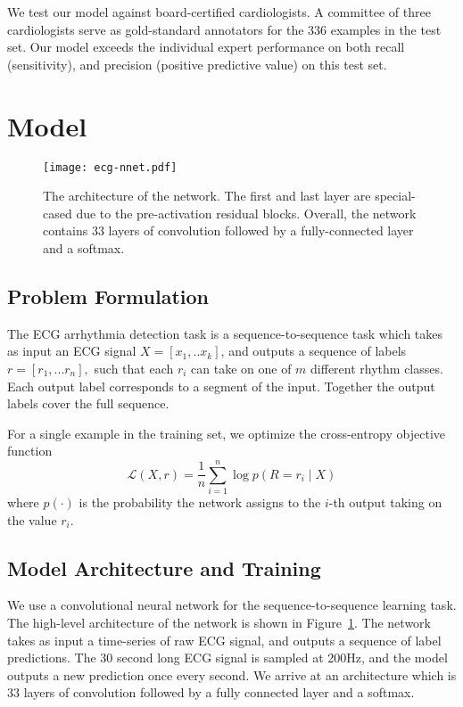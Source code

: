 \documentclass{article}
\begin{document}
We test our model against board-certified cardiologists. A committee of three cardiologists serve as gold-standard annotators for the 336 examples in the test set. Our model exceeds the individual expert performance on both recall (sensitivity), and precision (positive predictive value) on this test set.

\section{Model}
\label{model}
\begin{figure}[ht!]
  \centering
  \texttt{[image: ecg-nnet.pdf]}
  \caption{The architecture of the network. The first and last layer are special-cased due to the pre-activation residual blocks. Overall, the network contains 33 layers of convolution followed by a fully-connected layer and a softmax.}
  \label{fig:net}
\end{figure}


\subsection*{Problem Formulation}
The ECG arrhythmia detection task is a sequence-to-sequence task which takes as input an ECG signal $X=[x_1,.. x_k]$, and outputs a sequence of labels $r=[r_1, ... r_n],$ such that each $r_i$ can take on one of $m$ different rhythm classes. Each output label corresponds to a segment of the input. Together the output labels cover the full sequence.

For a single example in the training set, we optimize the cross-entropy objective function
\[
 \mathcal{L}(X, r) = \frac{1}{n} \sum_{i=1}^n \log p(R = r_i \mid X)
\]
where $p(\cdot)$ is the probability the network assigns to the $i$-th output taking on the value $r_i$.

\subsection*{Model Architecture and Training}
We use a convolutional neural network for the sequence-to-sequence learning task. The high-level architecture of the network is shown in Figure~\ref{fig:net}. The network takes as input a time-series of raw ECG signal, and outputs a sequence of label predictions. The 30 second long ECG signal is sampled at 200Hz, and the model outputs a new prediction once every second. We arrive at an architecture which is 33 layers of convolution followed by a fully connected layer and a softmax. 
\end{document}
